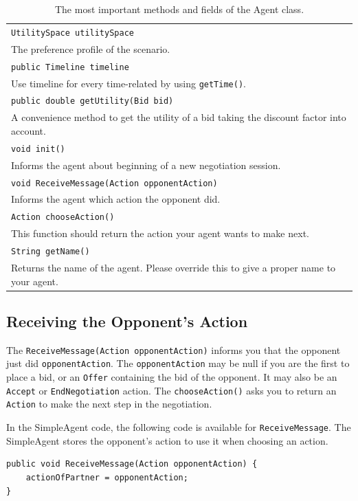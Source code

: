 \documentclass[]{article}
\begin{document}
\begin{table}
\begin{tabular}{m{}}
\hline
\texttt{UtilitySpace utilitySpace}\\
The preference profile of the scenario.\\
\hline
\texttt{public Timeline timeline}\\
Use timeline for every time-related by using \texttt{getTime()}.\\
\hline
\texttt{public double getUtility(Bid bid)}\\
A convenience method to get the utility of a bid taking the discount factor into account.\\
\hline
\texttt{void init()}\\
Informs the agent about beginning of a new negotiation session.\\
\hline
\texttt{void ReceiveMessage(Action opponentAction)}\\
Informs the agent which action the opponent did.\\
\hline
\texttt{Action chooseAction()}\\
This function should return the action your agent wants to make next.\\
\hline
\texttt{String getName()}\\
Returns the name of the agent. Please override this to give a proper name to your agent.\\
\hline
\end{tabular}
\caption{The most important methods and fields of the Agent class.}
\end{table}

\subsection{Receiving the Opponent's Action}
The \texttt{ReceiveMessage(Action opponentAction)} informs you that the opponent just did \texttt{opponentAction}. The \texttt{opponentAction} may be null if you are the first to place a bid, or an \texttt{Offer} containing the bid of the opponent. It may also be an \texttt{Accept} or \texttt{EndNegotiation} action.
The \texttt{chooseAction()} asks you to return an \texttt{Action} to make the next step in the negotiation.

In the SimpleAgent code, the following code is available for \texttt{ReceiveMessage}. The SimpleAgent stores the opponent's action to use it when choosing an action.

\begin{lstlisting}
public void ReceiveMessage(Action opponentAction) {
	actionOfPartner = opponentAction;
}
\end{lstlisting}
\end{document}
